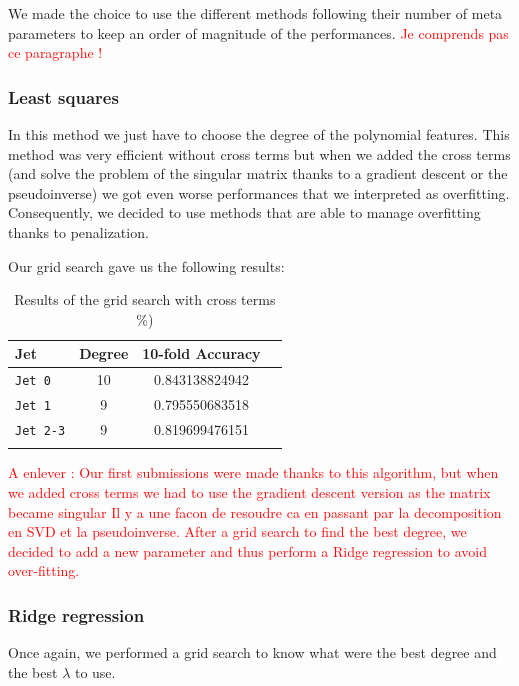 \documentclass[10pt,conference,compsocconf]{IEEEtran}
\begin{document}
We made the choice to use the different methods following their number of meta parameters to keep an order of magnitude of the performances.  \textcolor{red}{Je comprends pas ce paragraphe !}

\subsubsection{Least squares}

In this method we just have to choose the degree of the polynomial features. This method was very efficient without cross terms but when we added the cross terms (and solve the problem of the singular matrix thanks to a gradient descent or the pseudoinverse) we got even worse performances that we interpreted as overfitting. Consequently, we decided to use methods that are able to manage overfitting thanks to penalization.

Our grid search gave us the following results: 

\begin{table}[h!]
\centering
\caption{Results of the grid search with cross terms \%)}
\footnotesize
\hspace{-0.2cm}
\begin{tabular}{ l| ccc } 
 \hline
   Jet & Degree & 10-fold Accuracy  \\
 \hline
   \verb+Jet 0+  & 10 &  0.843138824942 \\
   \verb+Jet 1+  & 9 & 0.795550683518 \\
   \verb+Jet 2-3+  & 9 & 0.819699476151 \\
  \hline
\label{grid_search_ridge_cross}
\end{tabular}
\end{table}

\textcolor{red}{A enlever : Our first submissions were made thanks to this algorithm, but when we added cross terms we had to use the gradient descent version as the matrix became singular Il y a une facon de resoudre ca en passant par la decomposition en SVD et la pseudoinverse. After a grid search to find the best degree, we decided to add a new parameter and thus perform a Ridge regression to avoid over-fitting. }

\subsubsection{Ridge regression}

Once again, we performed a grid search to know what were the best degree and the best $\lambda$ to use.
\end{document}

